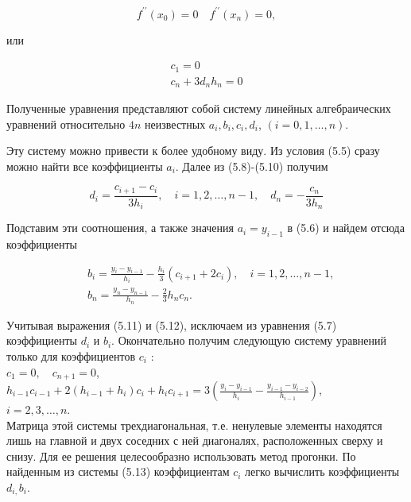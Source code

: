 \documentclass[10pt]{article}
\begin{document}
$$
f^{\prime \prime}\left(x_{0}\right)=0 \quad f^{\prime \prime}\left(x_{n}\right)=0,
$$

или


\begin{gather*}
c_{1}=0  \tag{5.9}\\
c_{n}+3 d_{n} h_{n}=0 \tag{5.10}
\end{gather*}


Полученные уравнения представляют собой систему линейных алгебраических уравнений относительно $4 n$ неизвестных $a_{i}, b_{i}, c_{i}, d_{i}$, $(i=0,1, \ldots, n)$.

Эту систему можно привести к более удобному виду. Из условия (5.5) сразу можно найти все коэффициенты $a_{i}$. Далее из (5.8)-(5.10) получим


\begin{equation*}
d_{i}=\frac{c_{i+1}-c_{i}}{3 h_{i}}, \quad i=1,2, \ldots, n-1, \quad d_{n}=-\frac{c_{n}}{3 h_{n}} \tag{5.11}
\end{equation*}


Подставим эти соотношения, а также значения $a_{i}=y_{i-1}$ в (5.6) и найдем отсюда коэффициенты


\begin{align*}
& b_{i}=\frac{y_{i}-y_{i-1}}{h_{i}}-\frac{h_{i}}{3}\left(c_{i+1}+2 c_{i}\right), \quad i=1,2, \ldots, n-1, \\
& b_{n}=\frac{y_{n}-y_{n-1}}{h_{n}}-\frac{2}{3} h_{n} c_{n} . \tag{5.12}
\end{align*}


Учитывая выражения (5.11) и (5.12), исключаем из уравнения (5.7) коэффициенты $d_{i}$ и $b_{i}$. Окончательно получим следующую систему уравнений только для коэффициентов $c_{i}$ :\\
$c_{1}=0, \quad c_{n+1}=0$,\\
$h_{i-1} c_{i-1}+2\left(h_{i-1}+h_{i}\right) c_{i}+h_{i} c_{i+1}=3\left(\frac{y_{i}-y_{i-1}}{h_{i}}-\frac{y_{i-1}-y_{i-2}}{h_{i-1}}\right)$,\\
$i=2,3, \ldots, n$.\\
Матрица этой системы трехдиагональная, т.е. ненулевые элементы находятся лишь на главной и двух соседних с ней диагоналях, расположенных сверху и снизу.
Для ее решения целесообразно использовать метод прогонки.
По найденным из системы (5.13) коэффициентам $c_{i}$ легко вычислить коэффициенты $d_{i,} b_{i}$.
\end{document}
